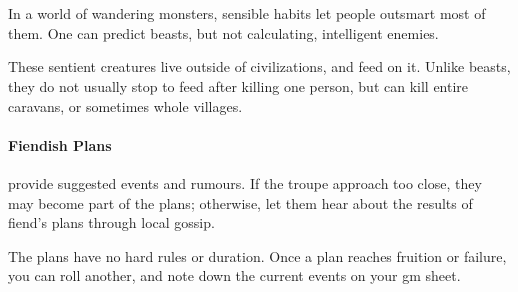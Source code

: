 \chapter[\Glsfmtplural{fiend} in the Forest]{}
\label{fiends}

\toggletrue{genExamples}

In a world of wandering monsters, sensible habits let people outsmart most of them.
One can predict beasts, but not calculating, intelligent enemies.

These sentient creatures live outside of civilizations, and feed on it.
Unlike beasts, they do not usually stop to feed after killing one person, but can kill entire caravans, or sometimes whole \glspl{village}.

\subsubsection{Fiendish Plans}
provide suggested events and rumours.
If the troupe approach too close, they may become part of the plans; otherwise, let them hear about the results of \gls{fiend}'s plans through local gossip.

The plans have no hard rules or duration.
Once a plan reaches fruition or failure, you can roll another, and note down the current events on your \gls{gm} sheet.

\section{}
\label{bandit}

